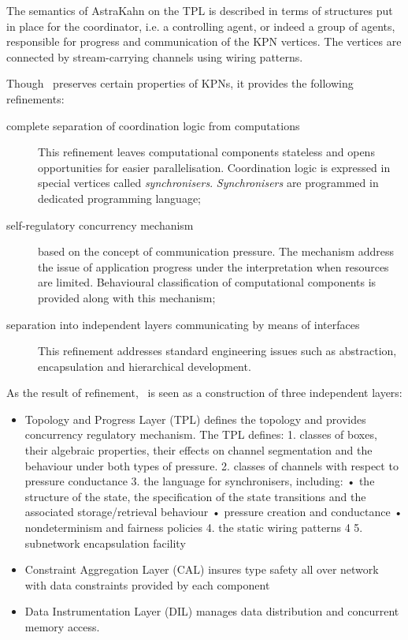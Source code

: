 The semantics of AstraKahn on the TPL is described in terms of structures put in place for the coordinator, i.e. a controlling agent, or indeed a group of agents, responsible for progress and communication of the KPN vertices. The vertices are connected by stream-carrying channels using wiring patterns.


Though \ak\ preserves certain properties of KPNs, it provides the following refinements:
\begin{description}
\item[complete separation of coordination logic from computations]

This refinement leaves computational components stateless and opens opportunities for easier parallelisation. Coordination logic is expressed in special vertices called \emph{synchronisers}. \emph{Synchronisers} are programmed in dedicated programming language;
\item[self-regulatory concurrency mechanism] based on the concept of communication pressure. The mechanism address the issue of application progress under the interpretation when resources are limited. Behavioural classification of computational components is provided along with this mechanism;
\item[separation into independent layers communicating by means of interfaces]

This refinement addresses standard engineering issues such as abstraction, encapsulation and hierarchical development.
\end{description}

As the result of refinement, \ak\ is seen as a construction of three independent layers:
\begin{itemize}
\item Topology and Progress Layer (TPL) defines the topology and provides concurrency regulatory mechanism.
The TPL defines:
1. classes of boxes, their algebraic properties, their effects on channel segmentation and the behaviour under both types of pressure.
2. classes of channels with respect to pressure conductance 3. the language for synchronisers, including:
• the structure of the state, the specification of the state transitions and the associated storage/retrieval behaviour
• pressure creation and conductance • nondeterminism and fairness policies
4. the static wiring patterns 4
5. subnetwork encapsulation facility

\item Constraint Aggregation Layer (CAL) insures type safety all over network with data constraints provided by each component

\item Data Instrumentation Layer (DIL) manages data distribution and concurrent memory access.
\end{itemize}



